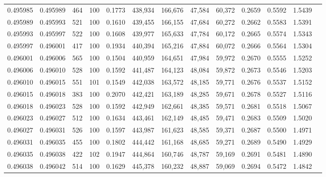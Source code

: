 \begin{tabular}{rrrrrrrrrrrrr}
0.495985 & 0.495989 &   464 & 100 &                                     0.1773 & 438,934 & 166,676 &  47,584 &  60,372 & 0.2659 & 0.5592 & 1.5439 \\
0.495989 & 0.495993 &   521 & 100 &                                     0.1610 & 439,455 & 166,155 &  47,684 &  60,272 & 0.2662 & 0.5583 & 1.5391 \\
0.495993 & 0.495997 &   522 & 100 &                                     0.1608 & 439,977 & 165,633 &  47,784 &  60,172 & 0.2665 & 0.5574 & 1.5343 \\
0.495997 & 0.496001 &   417 & 100 &                                     0.1934 & 440,394 & 165,216 &  47,884 &  60,072 & 0.2666 & 0.5564 & 1.5304 \\
0.496001 & 0.496006 &   565 & 100 &                                     0.1504 & 440,959 & 164,651 &  47,984 &  59,972 & 0.2670 & 0.5555 & 1.5252 \\
0.496006 & 0.496010 &   528 & 100 &                                     0.1592 & 441,487 & 164,123 &  48,084 &  59,872 & 0.2673 & 0.5546 & 1.5203 \\
0.496010 & 0.496015 &   551 & 101 &                                     0.1549 & 442,038 & 163,572 &  48,185 &  59,771 & 0.2676 & 0.5537 & 1.5152 \\
0.496015 & 0.496018 &   383 & 100 &                                     0.2070 & 442,421 & 163,189 &  48,285 &  59,671 & 0.2678 & 0.5527 & 1.5116 \\
0.496018 & 0.496023 &   528 & 100 &                                     0.1592 & 442,949 & 162,661 &  48,385 &  59,571 & 0.2681 & 0.5518 & 1.5067 \\
0.496023 & 0.496027 &   512 & 100 &                                     0.1634 & 443,461 & 162,149 &  48,485 &  59,471 & 0.2683 & 0.5509 & 1.5020 \\
0.496027 & 0.496031 &   526 & 100 &                                     0.1597 & 443,987 & 161,623 &  48,585 &  59,371 & 0.2687 & 0.5500 & 1.4971 \\
0.496031 & 0.496035 &   455 & 100 &                                     0.1802 & 444,442 & 161,168 &  48,685 &  59,271 & 0.2689 & 0.5490 & 1.4929 \\
0.496035 & 0.496038 &   422 & 102 &                                     0.1947 & 444,864 & 160,746 &  48,787 &  59,169 & 0.2691 & 0.5481 & 1.4890 \\
0.496038 & 0.496042 &   514 & 100 &                                     0.1629 & 445,378 & 160,232 &  48,887 &  59,069 & 0.2694 & 0.5472 & 1.4842 \\

\end{tabular}
